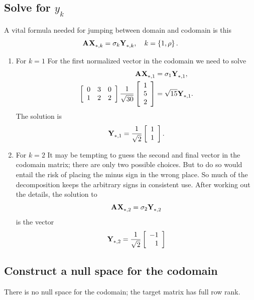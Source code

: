 \subsection{Solve for $y_{k}$}
A vital formula needed for jumping between domain and codomain is this
\begin{equation}
  \A{}\X{}_{*,k} = \sigma_{k} \Y{}_{*,k}, \quad k=\lst{1,\rho}.
  \label{eq:vital}
\end{equation}
\begin{enumerate}
\item For $k=1$
For the first normalized vector in the codomain we need to solve
\begin{equation}
  \begin{split}
    \A{}\X{}_{*,1} &= \sigma_{1} \Y{}_{*,1}, \\
    \mat{ccc}
    {0 & 3 & 0\\
     1 & 2 & 2
    }
    \frac{1}{\sqrt{30}}
    \mat{c}{1\\5\\2}
    & = 
    \sqrt{15} \Y{}_{*,1}.
  \end{split}
\end{equation}
The solution is
\begin{equation}
  \Y{}_{*,1} = \frac{1}{\sqrt{2}}\mat{c}{1\\1}.
\end{equation}
\item For $k=2$
It may be tempting to guess the second and final vector in the codomain matrix; there are only two possible choices. But to do so would entail the risk of placing the minus sign in the wrong place. So much of the decomposition keeps the arbitrary signs in consistent use. After working out the details, the solution to
\begin{equation}
  \A{}\X{}_{*,2} = \sigma_{2} \Y{}_{*,2}
\end{equation}
is the vector
\begin{equation}
  \Y{}_{*,2} = \frac{1}{\sqrt{2}}\mat{r}{-1\\1}
\end{equation}
\end{enumerate}

\subsection{Construct a null space for the codomain}
There is no null space for the codomain; the target matrix has full row rank.


